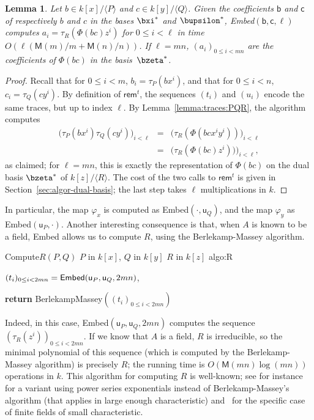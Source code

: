 \documentclass{sig-alternate}
\def\M {\ensuremath{\mathsf{M}}}
\def\vu {\ensuremath{\mathsf{u}}}
\def\vb {\ensuremath{\mathsf{b}}}
\def\vc {\ensuremath{\mathsf{c}}}
\def\rem {\ensuremath{\mathsf{rem}}}
\newcounter{algo}
\newenvironment{algorithm_endline}[4]{\small\begin{center}\begin{minipage}{0.48\textwidth}
      \refstepcounter{algo}
      \label{#4}
      \sf
      \rule{\textwidth}{0.2pt}\\
      \makebox[\textwidth][c]{Algorithm~\arabic{algo}:~\textbf{#1}}\\
      \rule[0.5\baselineskip]{\textwidth}{0.2pt}\\

      \vspace{-12pt}

      \parbox{\textwidth}{\textbf{Input} #2}
      \parbox{\textwidth}{\textbf{Output} #3}

\vspace{-7pt}

      \begin{enumerate*}}{\end{enumerate*}
      \vspace{-11pt}
      \rule{\textwidth}{0.2pt}
\end{minipage}\end{center}
}
\newcommand{\ang}[1]{\langle#1\rangle}
\newtheorem{Lemma}{Lemma}
\begin{document}
\begin{Lemma}\label{lemma:algo:embed}
  Let $b \in k[x]/\ang{P}$ and $c \in k[y]/\ang{Q}$.  Given the
  coefficients $\vb$ and $\vc$ of respectively $b$ and $c$ in the
  bases $\bxi^\ast$ and $\bupsilon^\ast$, {\sf Embed}$(\vb,\vc,\ell)$
  computes $a_i=\tau_R\left(\Phi(bc)z^i\right)$ for $0 \le i < \ell$ in time
  $O(\ell(\M(m)/m+\M(n)/n))$. If $\ell=mn$, $(a_i)_{0 \le i < mn}$ are
  the coefficients of $\Phi(bc)$ in the basis~$\bzeta^\ast$.
\end{Lemma}
\begin{proof}
  Recall that for $0 \le i <m$, $b_i = \tau_P(bx^i)$, and that for $0
  \le i < n$, $c_i = \tau_Q(cy^i)$. By definition of $\rem^t$, the
  sequences $(t_i)$ and $(u_i)$ encode the same traces, but up to
  index $\ell$.  By Lemma~\ref{lemma:traces:PQR}, the algorithm
  computes
  \begin{eqnarray*}
    \bigl(\tau_P(bx^i)\tau_Q(cy^i)\bigr)_{i<\ell} &=&  \bigl(\tau_R(\Phi(bc x^i y^i))\bigr)_{i<\ell}\\
    &=&  \bigl(\tau_R(\Phi(bc) z^i))\bigr)_{i<\ell},
  \end{eqnarray*}
  as claimed; for $\ell=mn$, this is exactly the representation of
  $\Phi(bc)$ on the dual basis $\bzeta^\ast$ of $k[z]/\ang{R}$. The
  cost of the two calls to $\rem^t$ is given in
  Section~\ref{sec:algor-dual-basis}; the last step takes $\ell$
  multiplications in $k$.
\end{proof}

In particular, the map $\varphi_x$ is computed as
{\sf Embed}$(\cdot,\vu_Q)$, and the map $\varphi_y$ as
{\sf Embed}$(\vu_P,\cdot)$. Another interesting consequence is that, when
$A$ is known to be a field, {\sf Embed} allows us to compute $R$, using the
Berlekamp-Massey algorithm.

\vspace{-2ex}

\begin{algorithm_endline}
{Compute$R(P,Q)$}
{$P$ in $k[x]$, $Q$ in $k[y]$}
{$R$ in $k[z]$}
{algo:R}
\item $(t_i)_{0 \le i < 2mn}={\sf Embed}(\vu_P,\vu_Q,2mn)$,
\item {\bf return} BerlekampMassey$((t_i)_{0 \le i < 2mn})$
\end{algorithm_endline}

Indeed, in this case, {\sf Embed}$(\vu_P,\vu_Q,2mn)$ computes the sequence
$(\tau_R(z^i))_{0\le i < 2mn}$. If we know that $A$ is a field, $R$ is
irreducible, so the minimal polynomial of this sequence (which is
computed by the Berlekamp-Massey algorithm) is precisely $R$; the
running time is $O(\M(mn)\log(mn))$ operations in $k$. This algorithm
for computing $R$ is well-known; see for instance~\cite{BoFlSaSc06}
for a variant using power series exponentials instead of
Berlekamp-Massey's algorithm (that applies in large enough
characteristic) and~\cite{BGPS05} for the specific case of finite
fields of small characteristic.
\end{document}
